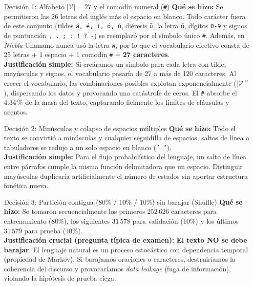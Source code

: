 \documentclass[11pt,letterpaper]{article}
\begin{document}
\begin{decisionbox}{Decisión 1: Alfabeto $|\mathcal{V}|=27$ y el comodín numeral (\texttt{\#})}
\textbf{Qué se hizo:} Se permitieron las 26 letras del inglés más el espacio en blanco. Todo carácter fuera de este conjunto (tildes \texttt{á, é, í, ó, ú}, diéresis \texttt{ü}, la letra \texttt{ñ}, dígitos \texttt{0-9} y signos de puntuación \texttt{, . ; : ! ? -}) se reemplazó por el símbolo único \texttt{\#}. Además, en \textit{Niebla} Unamuno nunca usó la letra \texttt{w}, por lo que el vocabulario efectivo consta de 25 letras + 1 espacio + 1 comodín \texttt{\#} = \textbf{27 caracteres}.\\[3pt]
\textbf{Justificación simple:} Si creáramos un símbolo para cada letra con tilde, mayúsculas y signos, el vocabulario pasaría de 27 a más de 120 caracteres. Al crecer el vocabulario, las combinaciones posibles explotan exponencialmente ($|\mathcal{V}|^n$), dispersando los datos y provocando una catástrofe de ceros. El \texttt{\#} absorbe el 4.34\,\% de la masa del texto, capturando fielmente los límites de cláusulas y acentos.
\end{decisionbox}

\begin{decisionbox}{Decisión 2: Minúsculas y colapso de espacios múltiples}
\textbf{Qué se hizo:} Todo el texto se convirtió a minúsculas y cualquier seguidilla de espacios, saltos de línea o tabuladores se redujo a un solo espacio en blanco (\texttt{' '}).\\[3pt]
\textbf{Justificación simple:} Para el flujo probabilístico del lenguaje, un salto de línea entre párrafos cumple la misma función delimitadora que un espacio. Distinguir mayúsculas duplicaría artificialmente el número de estados sin aportar estructura fonética nueva.
\end{decisionbox}

\begin{decisionbox}{Decisión 3: Partición contigua (80\% / 10\% / 10\%) sin barajar (Shuffle)}
\textbf{Qué se hizo:} Se tomaron secuencialmente los primeros $252\,626$ caracteres para entrenamiento (80\%), los siguientes $31\,578$ para validación (10\%) y los últimos $31\,579$ para prueba (10\%).\\[3pt]
\textbf{Justificación crucial (pregunta típica de examen):} \textbf{El texto NO se debe barajar}. El lenguaje natural es un proceso estocástico con dependencia temporal (propiedad de Markov). Si barajamos oraciones o caracteres, destruiríamos la coherencia del discurso y provocaríamos \textit{data leakage} (fuga de información), violando la hipótesis de prueba ciega.
\end{decisionbox}
\end{document}
